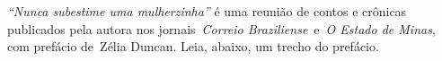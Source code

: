 

\pagebreak
\emph{``Nunca subestime uma mulherzinha''} é uma reunião de contos e
crônicas publicados pela autora nos jornais~\emph{Correio
Braziliense}~e~\emph{O Estado de Minas}, com prefácio de~Zélia Duncan. Leia, abaixo, um trecho do prefácio.

